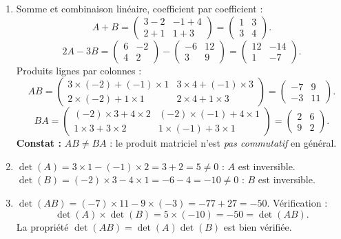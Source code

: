 \documentclass[11pt]{article}
\begin{document}
\begin{corrige}
\begin{enumerate}
\item Somme et combinaison linéaire, coefficient par coefficient :
\[ A+B=\begin{pmatrix} 3-2 & -1+4 \\ 2+1 & 1+3 \end{pmatrix}=\begin{pmatrix} 1 & 3 \\ 3 & 4 \end{pmatrix}. \]
\[ 2A-3B=\begin{pmatrix} 6 & -2 \\ 4 & 2 \end{pmatrix}-\begin{pmatrix} -6 & 12 \\ 3 & 9 \end{pmatrix}=\begin{pmatrix} 12 & -14 \\ 1 & -7 \end{pmatrix}. \]
Produits lignes par colonnes :
\[ AB=\begin{pmatrix} 3\times(-2)+(-1)\times1 & 3\times4+(-1)\times3 \\ 2\times(-2)+1\times1 & 2\times4+1\times3 \end{pmatrix}=\begin{pmatrix} -7 & 9 \\ -3 & 11 \end{pmatrix}. \]
\[ BA=\begin{pmatrix} (-2)\times3+4\times2 & (-2)\times(-1)+4\times1 \\ 1\times3+3\times2 & 1\times(-1)+3\times1 \end{pmatrix}=\begin{pmatrix} 2 & 6 \\ 9 & 2 \end{pmatrix}. \]
\textbf{Constat :} $AB\neq BA$ : le produit matriciel n'est \emph{pas commutatif} en général.

\item $\det(A)=3\times1-(-1)\times2=3+2=5\neq0$ : $A$ est inversible. $\det(B)=(-2)\times3-4\times1=-6-4=-10\neq0$ : $B$ est inversible.

\item $\det(AB)=(-7)\times11-9\times(-3)=-77+27=-50$. Vérification :
\[ \det(A)\times\det(B)=5\times(-10)=-50=\det(AB). \]
La propriété $\det(AB)=\det(A)\det(B)$ est bien vérifiée.
\end{enumerate}
\end{corrige}
\end{document}
